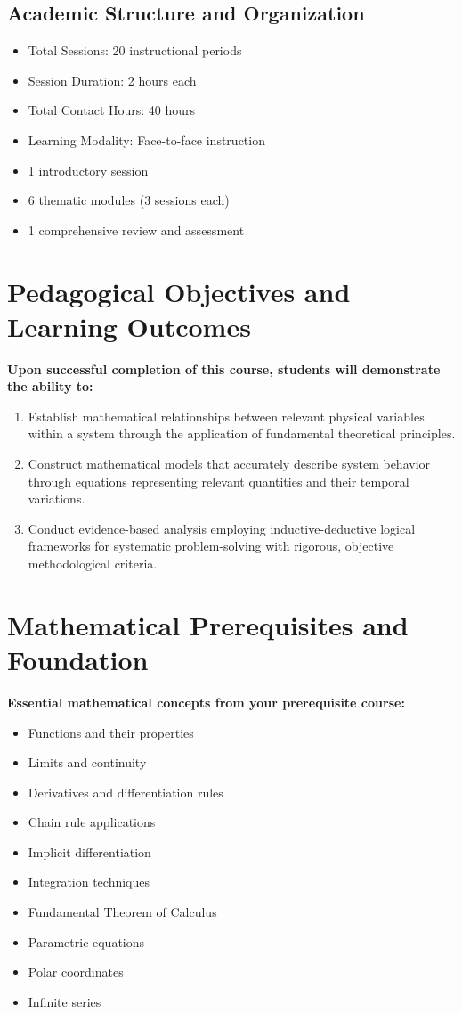 \documentclass[12pt, letterpaper]{book}
\begin{document}
\subsection{Academic Structure and Organization}
\begin{itemize}
    \item Total Sessions: 20 instructional periods
    \item Session Duration: 2 hours each
    \item Total Contact Hours: 40 hours
    \item Learning Modality: Face-to-face instruction
    \item 1 introductory session
    \item 6 thematic modules (3 sessions each)
    \item 1 comprehensive review and assessment
\end{itemize}

\section{Pedagogical Objectives and Learning Outcomes}
\textbf{Upon successful completion of this course, students will demonstrate the ability to:}
\begin{enumerate}
    \item Establish mathematical relationships between relevant physical variables within a system through the application of fundamental theoretical principles.
    \item Construct mathematical models that accurately describe system behavior through equations representing relevant quantities and their temporal variations.
    \item Conduct evidence-based analysis employing inductive-deductive logical frameworks for systematic problem-solving with rigorous, objective methodological criteria.
\end{enumerate}

\section{Mathematical Prerequisites and Foundation}
\textbf{Essential mathematical concepts from your prerequisite course:}
\begin{multicols}{2}
\begin{itemize}
    \item Functions and their properties
    \item Limits and continuity
    \item Derivatives and differentiation rules
    \item Chain rule applications
    \item Implicit differentiation
    \item Integration techniques
    \item Fundamental Theorem of Calculus
    \item Parametric equations
    \item Polar coordinates
    \item Infinite series
\end{itemize}
\end{multicols}
\end{document}
